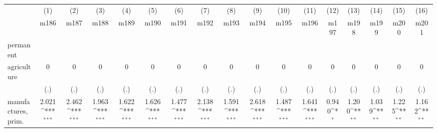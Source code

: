 {
\def\sym#1{\ifmmode^{#1}\else\(^{#1}\)\fi}
\begin{tabular}{l*{16}{c}}
\hline\hline
                    &\multicolumn{1}{c}{(1)}&\multicolumn{1}{c}{(2)}&\multicolumn{1}{c}{(3)}&\multicolumn{1}{c}{(4)}&\multicolumn{1}{c}{(5)}&\multicolumn{1}{c}{(6)}&\multicolumn{1}{c}{(7)}&\multicolumn{1}{c}{(8)}&\multicolumn{1}{c}{(9)}&\multicolumn{1}{c}{(10)}&\multicolumn{1}{c}{(11)}&\multicolumn{1}{c}{(12)}&\multicolumn{1}{c}{(13)}&\multicolumn{1}{c}{(14)}&\multicolumn{1}{c}{(15)}&\multicolumn{1}{c}{(16)}\\
                    &\multicolumn{1}{c}{m186}&\multicolumn{1}{c}{m187}&\multicolumn{1}{c}{m188}&\multicolumn{1}{c}{m189}&\multicolumn{1}{c}{m190}&\multicolumn{1}{c}{m191}&\multicolumn{1}{c}{m192}&\multicolumn{1}{c}{m193}&\multicolumn{1}{c}{m194}&\multicolumn{1}{c}{m195}&\multicolumn{1}{c}{m196}&\multicolumn{1}{c}{m197}&\multicolumn{1}{c}{m198}&\multicolumn{1}{c}{m199}&\multicolumn{1}{c}{m200}&\multicolumn{1}{c}{m201}\\
\hline
permanent           &                     &                     &                     &                     &                     &                     &                     &                     &                     &                     &                     &                     &                     &                     &                     &                     \\
agriculture         &           0         &           0         &           0         &           0         &           0         &           0         &           0         &           0         &           0         &           0         &           0         &           0         &           0         &           0         &           0         &           0         \\
                    &         (.)         &         (.)         &         (.)         &         (.)         &         (.)         &         (.)         &         (.)         &         (.)         &         (.)         &         (.)         &         (.)         &         (.)         &         (.)         &         (.)         &         (.)         &         (.)         \\
[1em]
manufactures, prim. &       2.021\sym{***}&       2.462\sym{***}&       1.963\sym{***}&       1.622\sym{***}&       1.626\sym{***}&       1.477\sym{***}&       2.138\sym{***}&       1.591\sym{***}&       2.618\sym{***}&       1.487\sym{***}&       1.641\sym{***}&       0.940\sym{*}  &       1.200\sym{**} &       1.039\sym{**} &       1.225\sym{**} &       1.162\sym{**} \\

\end{tabular}}
